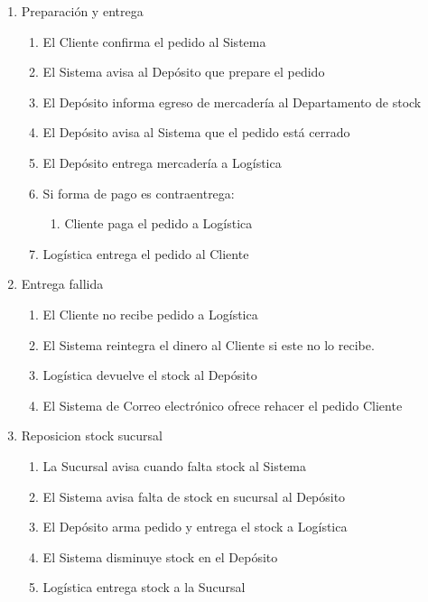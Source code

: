 \begin{enumerate}
 \item Preparación y entrega
  \begin{enumerate}
    \item El Cliente confirma el pedido al Sistema
    \item El Sistema avisa al Depósito que prepare el pedido 
    \item El Depósito informa egreso de mercadería al Departamento de stock
    \item El Depósito avisa al Sistema que el pedido está cerrado
    \item El Depósito entrega mercadería a Logística
    \item Si forma de pago es contraentrega: 
    \begin{enumerate}
      \item Cliente paga el pedido a Logística
    \end{enumerate}
    \item Logística entrega el pedido al Cliente
  \end{enumerate}

 \item Entrega fallida
  \begin{enumerate}
    \item El Cliente no recibe pedido a Logística
    \item El Sistema reintegra el dinero al Cliente si este no lo recibe. %
    \item Logística devuelve el stock al Depósito
    \item El Sistema de Correo electrónico ofrece rehacer el pedido Cliente
  \end{enumerate}

 \item Reposicion stock sucursal
  \begin{enumerate}
    \item La Sucursal avisa cuando falta stock al Sistema
    \item El Sistema avisa falta de stock en sucursal al Depósito
    \item El Depósito arma pedido y entrega el stock a Logística
    \item El Sistema disminuye stock en el Depósito
    \item Logística entrega stock a la Sucursal
  \end{enumerate}


\end{enumerate}
